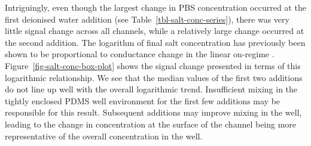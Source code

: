 \documentclass[
  a4paper,
]{scrbook}
\begin{document}
Intriguingly, even though the largest change in PBS concentration
occurred at the first deionised water addition (see
Table~\ref{tbl-salt-conc-series}), there was very little signal change
across all channels, while a relatively large change occurred at the
second addition. The logarithm of final salt concentration has
previously been shown to be proportional to conductance change in the
linear on-regime \autocite{Heller2010}.
Figure~\ref{fig-salt-conc-box-plot} shows the signal change presented in
terms of this logarithmic relationship. We see that the median values of
the first two additions do not line up well with the overall logarithmic
trend. Insufficient mixing in the tightly enclosed PDMS well environment
for the first few additions may be responsible for this result.
Subsequent additions may improve mixing in the well, leading to the
change in concentration at the surface of the channel being more
representative of the overall concentration in the well.
\end{document}
